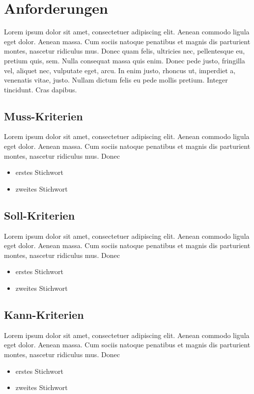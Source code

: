 \chapter{Anforderungen}
\label{sec:Anforderungen}

Lorem ipsum dolor sit amet, consectetuer adipiscing elit. Aenean commodo ligula eget dolor. Aenean massa. Cum sociis natoque penatibus et magnis dis parturient montes, nascetur ridiculus mus. Donec quam felis, ultricies nec, pellentesque eu, pretium quis, sem. Nulla consequat massa quis enim. Donec pede justo, fringilla vel, aliquet nec, vulputate eget, arcu. In enim justo, rhoncus ut, imperdiet a, venenatis vitae, justo. Nullam dictum felis eu pede mollis pretium. Integer tincidunt. Cras dapibus.


\section{Muss-Kriterien}
\label{subsec:Muss-Kriterien}
Lorem ipsum dolor sit amet, consectetuer adipiscing elit. Aenean commodo ligula eget dolor. Aenean massa. Cum sociis natoque penatibus et magnis dis parturient montes, nascetur ridiculus mus. Donec 
\begin{itemize}
\item erstes Stichwort
\item zweites Stichwort
\end{itemize}



\section{Soll-Kriterien}
\label{subsec:Soll-Kriterien}
Lorem ipsum dolor sit amet, consectetuer adipiscing elit. Aenean commodo ligula eget dolor. Aenean massa. Cum sociis natoque penatibus et magnis dis parturient montes, nascetur ridiculus mus. Donec 
\begin{itemize}
\item erstes Stichwort
\item zweites Stichwort
\end{itemize}


\section{Kann-Kriterien}
\label{subsec:Kann-Kriterien}
Lorem ipsum dolor sit amet, consectetuer adipiscing elit. Aenean commodo ligula eget dolor. Aenean massa. Cum sociis natoque penatibus et magnis dis parturient montes, nascetur ridiculus mus. Donec 
\begin{itemize}
\item erstes Stichwort
\item zweites Stichwort
\end{itemize}



